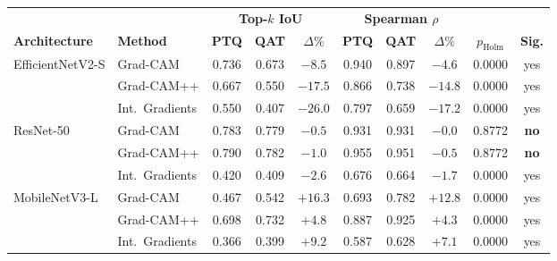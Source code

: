 \begin{tabular}{ll ccc ccc cc}
\toprule
 & & \multicolumn{3}{c}{\textbf{Top-$k$ IoU}} & \multicolumn{3}{c}{\textbf{Spearman $\rho$}} & & \\
\cmidrule(lr){3-5} \cmidrule(lr){6-8}
\textbf{Architecture} & \textbf{Method} & \textbf{PTQ} & \textbf{QAT} & \textbf{$\Delta\%$} & \textbf{PTQ} & \textbf{QAT} & \textbf{$\Delta\%$} & \textbf{$p_{\text{Holm}}$} & \textbf{Sig.} \\
\midrule
\multirow{3}{*}{EfficientNetV2-S}
 & Grad-CAM & 0.736 & 0.673 & $-8.5$ & 0.940 & 0.897 & $-4.6$ & 0.0000 & yes \\
 & Grad-CAM++ & 0.667 & 0.550 & $-17.5$ & 0.866 & 0.738 & $-14.8$ & 0.0000 & yes \\
 & Int.\ Gradients & 0.550 & 0.407 & $-26.0$ & 0.797 & 0.659 & $-17.2$ & 0.0000 & yes \\
\midrule
\multirow{3}{*}{ResNet-50}
 & Grad-CAM & 0.783 & 0.779 & $-0.5$ & 0.931 & 0.931 & $-0.0$ & 0.8772 & \textbf{no} \\
 & Grad-CAM++ & 0.790 & 0.782 & $-1.0$ & 0.955 & 0.951 & $-0.5$ & 0.8772 & \textbf{no} \\
 & Int.\ Gradients & 0.420 & 0.409 & $-2.6$ & 0.676 & 0.664 & $-1.7$ & 0.0000 & yes \\
\midrule
\multirow{3}{*}{MobileNetV3-L}
 & Grad-CAM & 0.467 & 0.542 & $+16.3$ & 0.693 & 0.782 & $+12.8$ & 0.0000 & yes \\
 & Grad-CAM++ & 0.698 & 0.732 & $+4.8$ & 0.887 & 0.925 & $+4.3$ & 0.0000 & yes \\
 & Int.\ Gradients & 0.366 & 0.399 & $+9.2$ & 0.587 & 0.628 & $+7.1$ & 0.0000 & yes \\
\bottomrule
\end{tabular}
